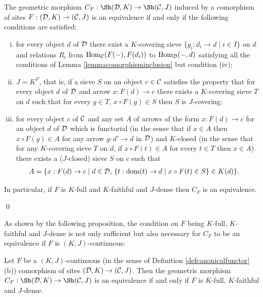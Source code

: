 \documentclass[a4paper,12pt]{article}
\begin{document}
\begin{proposition}
The geometric morphism $C_{F}:\Sh({\cal D}, K)\to \Sh({\cal C}, J)$ induced by a comorphism of sites $F:({\cal D}, K)\to ({\cal C}, J)$ is an equivalence if and only if the following conditions are satisfied:
\begin{enumerate}[(i)]
	\item for every object $d$ of $\cal D$ there exist a $K$-covering sieve $\{g_{i}:d_{i}\to d \mid i\in I\}$ on $d$ and  relations $R_{i}$ from $\textup{Hom}_{\cal C}(F(-),F(d_{i}))$ to $\textup{Hom}_{\cal D}(-,d)$ satisfying all the conditions of Lemma \ref{lemmacomorphisminclusion} but condition (iv); 
	
	\item $J=K^{F}$, that is, if a sieve $S$ on an object $c\in {\cal C}$ satisfies the property that for every object $d$ of $\cal D$ and arrow $x:F(d)\to c$ there exists a $K$-covering sieve $T$ on $d$ such that for every $g\in T$, $x\circ F(g)\in S$ then $S$ is $J$-covering;  
	
	\item for every object $c$ of $\cal C$ and any set $A$ of arrows of the form $x:F(d)\to c$ for an object $d$ of $\cal D$ which is functorial (in the sense that if $x\in A$ then $x\circ F(g)\in A$ for any arrow $g:d'\to d$ in $\cal D$) and $K$-closed (in the sense that for any $K$-covering sieve $T$ on $d$, if $x\circ F(t)\in A$ for every $t\in T$ then $x\in A$) there exists a ($J$-closed) sieve $S$ on $c$ such that 	
	\begin{equation*}\begin{split}
	A &= \{x:F(d)\to c \mid d\in {\cal D}\textup{, } \{t:\textup{dom}(t)\to d \mid x\circ F(t)\in S\}\in K(d)\}. 
	\end{split}\end{equation*}
\end{enumerate}	
	In particular, if $F$ is $K$-full and $K$-faithful and $J$-dense then $C_{F}$ is an equivalence. 
\end{proposition}\qed

As shown by the following proposition, the condition on $F$ being $K$-full, $K$-faithful and $J$-dense is not only sufficient but also necessary for $C_{F}$ to be an equivalence if $F$ is $(K, J)$-continuous:

\begin{proposition}
	Let $F$ be a $(K, J)$-continuous (in the sense of Definition \ref{defcanonicalfunctor}(b)) comorphism of sites $({\cal D}, K)\to ({\cal C}, J)$. Then the geometric morphism $C_{F}:\Sh({\cal D}, K)\to \Sh({\cal C}, J)$ is an equivalence if and only if $F$ is $K$-full, $K$-faithful and $J$-dense. 
\end{proposition}	
\end{document}
